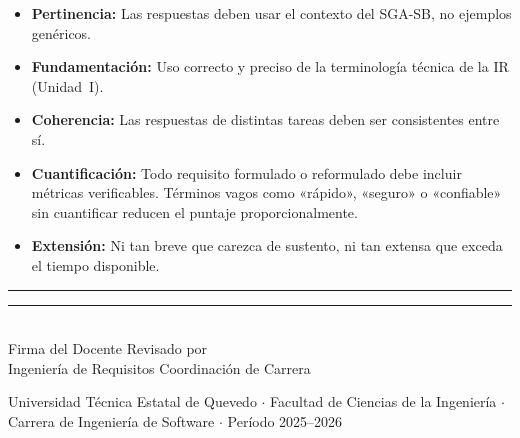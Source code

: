 \documentclass[11pt,a4paper]{article}
\begin{document}
	\begin{itemize}[leftmargin=*,itemsep=2pt]
		\item \textbf{Pertinencia:} Las respuestas deben usar el contexto del
		SGA-SB, no ejemplos genéricos.
		\item \textbf{Fundamentación:} Uso correcto y preciso de la terminología
		técnica de la IR (Unidad~I).
		\item \textbf{Coherencia:} Las respuestas de distintas tareas deben ser
		consistentes entre sí.
		\item \textbf{Cuantificación:} Todo requisito formulado o reformulado debe
		incluir métricas verificables. Términos vagos como «rápido»,
		«seguro» o «confiable» sin cuantificar reducen el puntaje
		proporcionalmente.
		\item \textbf{Extensión:} Ni tan breve que carezca de sustento, ni tan
		extensa que exceda el tiempo disponible.
	\end{itemize}
	
	\vfill
	\begin{center}
		\rule{5cm}{0.4pt}\hspace{3cm}\rule{5cm}{0.4pt}\\[4pt]
		{\small Firma del Docente \hspace{3.5cm} Revisado por}\\
		{\small Ingeniería de Requisitos \hspace{2cm} Coordinación de Carrera}
	\end{center}
	
	\vspace{6pt}
	\begin{center}
		{\footnotesize Universidad Técnica Estatal de Quevedo $\cdot$ Facultad de
			Ciencias de la Ingeniería $\cdot$ Carrera de Ingeniería de Software
			$\cdot$ Período 2025--2026}
	\end{center}
	
\end{document}
